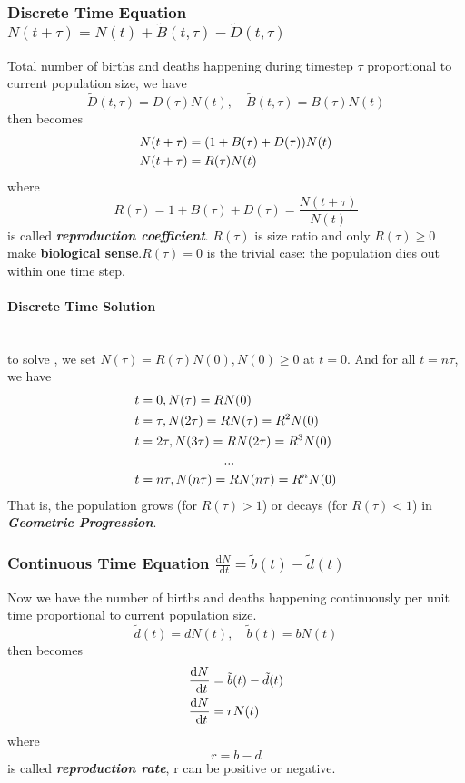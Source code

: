 \subsubsection{Discrete Time Equation $N(t+\tau)=N(t)+\tilde{B}(t, \tau)-\tilde{D}(t, \tau)$}
Total number of births and deaths happening during timestep $\tau$ proportional to current population size, we have
$$
    \tilde{D}(t, \tau)=D(\tau) N(t), \quad \tilde{B}(t, \tau)=B(\tau) N(t)
$$
then  becomes
\begin{align}
    N(t+\tau) & =(1+B(\tau)+D(\tau))N(t)\notag \\
    N(t+\tau) & =R(\tau)N(t)\label{eq1.3}
\end{align}
where
$$
    R(\tau) = 1+B(\tau)+D(\tau) = \frac{N(t+\tau)}{N(t)}
$$
is called \textbf{\emph{reproduction coefficient}}. $R(\tau)$ is size ratio and only $R(\tau)\geq 0$ make \textbf{biological sense}.$R(\tau) = 0$ is the trivial case: the population dies out within one time step.

\paragraph{Discrete Time Solution}~{}\\
to solve , we set $N(\tau)=R(\tau)N(0), N(0)\geq 0$ at $t=0$. And for all $t=n\tau$, we have
\begin{align}
     & t=0,N(\tau)=RN(0)\notag                              \\
     & t=\tau, N(2\tau)=R N(\tau)=R^{2} N(0)\notag          \\
     & t=2 \tau, N(3 \tau)=R N(2 \tau)=R^{3} N(0)\notag     \\
     & \qquad \qquad \qquad \quad...\notag                  \\
     & t=n \tau, N(n\tau)=RN(n\tau)=R^{n} N(0)\label{eq1.4}
\end{align}
That is, the population grows (for $R(\tau) > 1$) or decays (for $R(\tau) < 1$) in \emph{\textbf{Geometric Progression}}.

\newpage

\subsubsection{Continuous Time Equation $\frac{\mathrm{d} N}{\mathrm{~d} t}=\tilde{b}(t)-\tilde{d}(t)$}
Now we have the number of births and deaths happening continuously per unit time proportional to current population size.
$$
    \tilde{d}(t)=d N(t), \quad \tilde{b}(t)=b N(t)
$$
then  becomes
\begin{align}
    \frac{\mathrm{d} N}{\mathrm{~d} t} & =\tilde{b}(t)-\tilde{d}(t)\notag \\
    \frac{\mathrm{d} N}{\mathrm{~d} t} & =rN(t) \label{eq1.5}
\end{align}
where
$$
    r=b-d
$$
is called \emph{\textbf{reproduction rate}}, r can be positive or negative.

